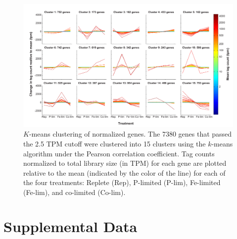 \begin{landscape}
   \null         %
   \vfill        %
   \centering 
    \begin{figure}
    \centering
        \includegraphics[width=1\textwidth]{Images/C2_FigureS2_v6.pdf}
        \caption[$K$-means clustering of normalized genes]{$K$-means clustering of normalized genes. The 7380 genes that passed the 2.5 TPM cutoff were clustered into 15 clusters using the $k$-means algorithm under the Pearson correlation coefficient. Tag counts normalized to total library size (in TPM) for each gene are plotted relative to the mean (indicated by the color of the line) for each of the four treatments: Replete (Rep), P-limited (P-lim), Fe-limited (Fe-lim), and co-limited (Co-lim).}

    \end{figure}
    \vfill        %
\end{landscape}

\clearpage
\section{Supplemental Data}


